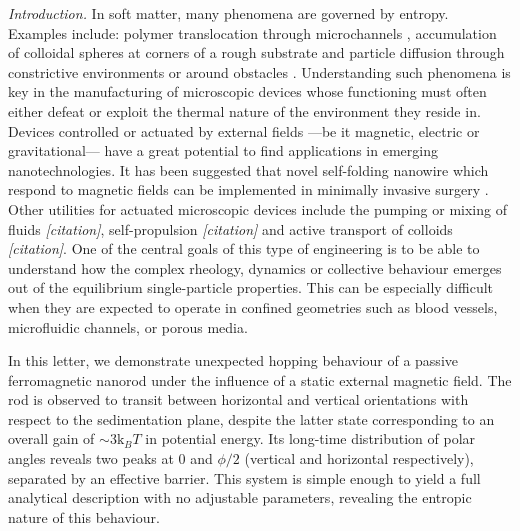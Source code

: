 \documentclass[aps,prl,twocolumn,superscriptaddress]{revtex4-1}
\newcommand{\kk}{\mathrm{k}_B}
\begin{document}
%
%
%
%
%
%
%
\emph{Introduction.} In soft matter, many phenomena are governed by entropy. Examples include: polymer translocation through microchannels \cite{Muthukumar1989,Ledesma-Aguilar2012}, accumulation of colloidal spheres at corners of a rough substrate \cite{Dinsmore1996} and particle diffusion through constrictive environments or around obstacles \cite{Chou1999,Zwanzig1992}. Understanding such phenomena is key in the manufacturing of microscopic devices whose functioning must often either defeat or exploit the thermal nature of the environment they reside in. Devices controlled or actuated by external fields ---be it magnetic, electric or gravitational--- have a great potential to find applications in emerging nanotechnologies. It has been suggested that novel self-folding nanowire which respond to magnetic fields can be implemented in minimally invasive surgery \cite{Xi2013,Solovev2012}. Other utilities for actuated microscopic devices include the pumping or mixing of fluids \emph{[citation]}, self-propulsion \emph{[citation]} and active transport of colloids \emph{[citation]}. One of the central goals of this type of engineering is to be able to understand how the complex rheology, dynamics or collective behaviour emerges out of the equilibrium single-particle properties. This can be especially difficult when they are expected to operate in confined geometries such as blood vessels, microfluidic channels, or porous media. 

In this letter, we demonstrate unexpected hopping behaviour of a passive ferromagnetic nanorod under the influence of a static external magnetic field. The rod is observed to transit between horizontal and vertical orientations with respect to the sedimentation plane, despite the latter state corresponding to an overall gain of $\sim3 \kk T$ in potential energy. Its long-time distribution of polar angles reveals two peaks at $0$ and $\phi/2$ (vertical and horizontal respectively), separated by an effective barrier. This system is simple enough to yield a full analytical description with no adjustable parameters, revealing the entropic nature of this behaviour.  
\end{document}
